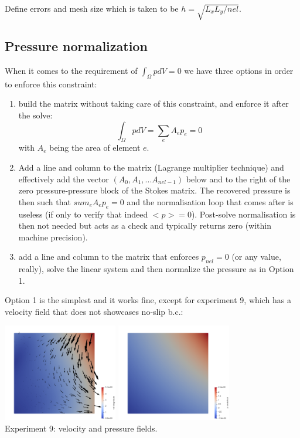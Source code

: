 Define errors and mesh size which is taken to be $h = \sqrt{L_xL_y/nel}$. 

\subsection*{Pressure normalization}

When it comes to the requirement of $\int_\Omega p dV=0$ we have three options
in order to enforce this constraint:
\begin{enumerate}
\item build the matrix without taking care of this constraint, and 
enforce it after the solve:
\[
\int_\Omega p dV = \sum_e A_e p_e = 0
\]
with $A_e$ being the area of element $e$.

\item Add a line and column to the matrix (Lagrange multiplier technique)
and effectively add the vector $(A_0,	 A_1, ... A_{nel-1})$ below and to the 
right of the zero pressure-pressure block of the Stokes matrix. 
The recovered pressure is then such that $sum_e A_e p_e = 0$
and the normalisation loop that comes after is useless (if only to 
verify that indeed $<p>=0$).
Post-solve normalisation is then not needed but acts as a check 
and typically returns zero (within machine precision).

\item add a line and column to the matrix that enforces $p_{nel}=0$
(or any value, really), solve the linear system and then 
normalize the pressure as in Option 1.

\end{enumerate}

Option 1 is the simplest and it works fine, except for 
experiment 9, which has a velocity field that 
does not showcases no-slip b.c.:

\begin{center}
\includegraphics[width=5cm]{python_codes/fieldstone_78/results/exp09/vel.png}
\includegraphics[width=5cm]{python_codes/fieldstone_78/results/exp09/press.png}\\
{\captionfont Experiment 9: velocity and pressure fields.}
\end{center}

